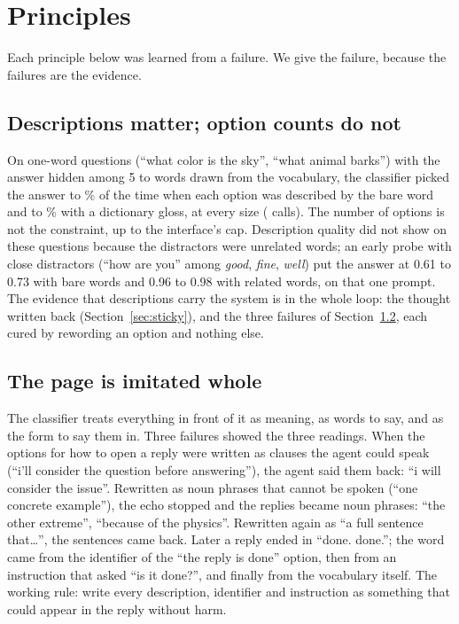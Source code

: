 \documentclass[10pt,twocolumn]{article}
\newcommand{\jev}[1]{``\textsf{#1}''}
\newcommand{\usr}[1]{``\textsf{#1}''}
\begin{document}
\section{Principles}\label{sec:principles}

Each principle below was learned from a failure. We give the failure, because the failures are the
evidence.

\subsection{Descriptions matter; option counts do not}

On \FoneN{} one-word questions (\usr{what color is the sky}, \usr{what animal barks}) with the
answer hidden among 5 to \FoneMaxSize{} words drawn from the vocabulary, the classifier picked the
answer \FoneBareMin{} to \FoneBareMax\% of the time when each option was described by the bare word
and \FoneRichMin{} to \FoneRichMax\% with a dictionary gloss, at every size (\FoneCalls{} calls).
The number of options is not the constraint, up to the interface's cap. Description quality did not
show on these questions because the distractors were unrelated words; an early probe with close
distractors (\usr{how are you} among \emph{good}, \emph{fine}, \emph{well}) put the answer at 0.61
to 0.73 with bare words and 0.96 to 0.98 with related words, on that one prompt. The evidence that
descriptions carry the system is in the whole loop: the thought written back
(Section~\ref{sec:sticky}), and the three failures of Section~\ref{sec:page}, each cured by rewording
an option and nothing else.

\subsection{The page is imitated whole}\label{sec:page}

The classifier treats everything in front of it as meaning, as words to say, and as the form to say
them in. Three failures showed the three readings. When the options for how to open a reply were
written as clauses the agent could speak (``i'll consider the question before answering''), the
agent said them back: \jev{i will consider the issue}. Rewritten as noun phrases that cannot be spoken
(``one concrete example''), the echo stopped and the replies became noun phrases:
\jev{the other extreme}, \jev{because of the physics}. Rewritten again as ``a full sentence
that\ldots'', the sentences came back. Later a reply ended in \jev{done. done.}; the word came from
the identifier of the ``the reply is done'' option, then from an instruction that asked ``is it
done?'', and finally from the vocabulary itself. The working rule: write every description,
identifier and instruction as something that could appear in the reply without harm.
\end{document}

